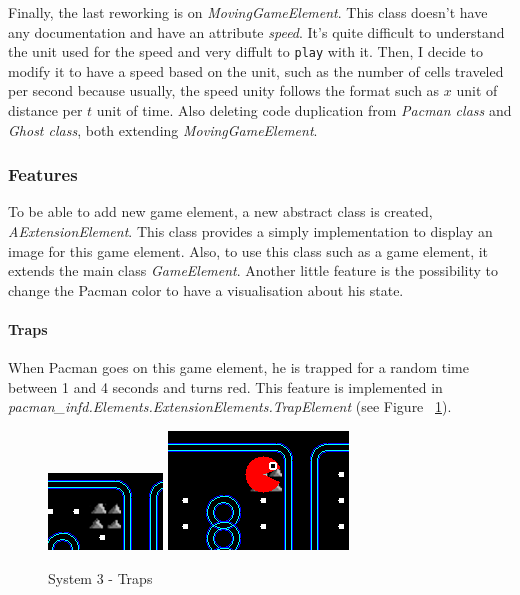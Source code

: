 \documentclass{article}
\begin{document}
Finally, the last reworking is on \textit{MovingGameElement}. This class doesn't have any documentation and have an attribute \textit{speed}. It's quite difficult to understand the unit used for the speed and very diffult to \texttt{play} with it. Then, I decide to modify it to have a speed based on the unit, such as the number of cells traveled per second because usually, the speed unity follows the format such as $x$ unit of distance per $t$ unit of time. Also deleting code duplication from \textit{Pacman class} and \textit{Ghost class}, both extending \textit{MovingGameElement}.\\

\subsubsection{Features}

To be able to add new game element, a new abstract class is created, \textit{AExtensionElement}. This class provides a simply implementation to display an image for this game element. Also, to use this class such as a game element, it extends the main class \textit{GameElement}. Another little feature is the possibility to change the Pacman color to have a visualisation about his state.\\

\paragraph{Traps}

When Pacman goes on this game element, he is trapped for a random time between 1 and 4 seconds and turns red. This feature is implemented in \textit{pacman\_infd.Elements.ExtensionElements.TrapElement} (see Figure ~\ref{fig:system3Traps}).\\

\begin{figure}
\centering
    \includegraphics[width=.4\linewidth]{imgs/trapbefore.PNG}
    \includegraphics[width=.4\linewidth]{imgs/trapafter.PNG}
    \caption{System 3 - Traps}
    \label{fig:system3Traps}
\end{figure}
\end{document}
